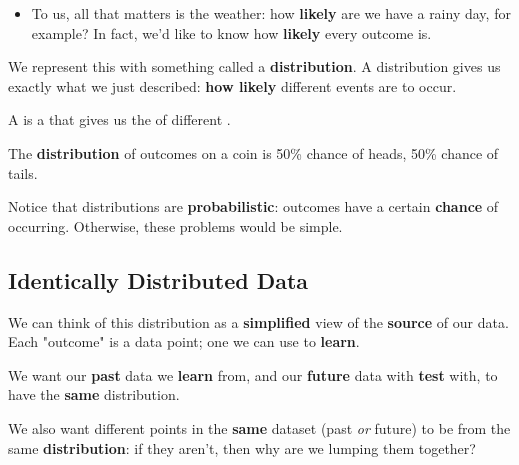         \begin{itemize}
            \item \miniex To us, all that matters is the weather: how \textbf{likely} are we have a rainy day, for example? In fact, we'd like to know how \textbf{likely} every outcome is.
        \end{itemize}
        
        We represent this with something called a \textbf{distribution}. A distribution gives us exactly what we just described: \textbf{how likely} different events are to occur. 
        \\
        
        \begin{definition}
            A  is a  that gives us the  of different .
        \end{definition}
        
        
        \miniex The \textbf{distribution} of outcomes on a coin is 50\% chance of heads, 50\% chance of tails.
        
        Notice that distributions are \textbf{probabilistic}: outcomes have a certain \textbf{chance} of occurring. Otherwise, these problems would be simple.
        
    \subsection{Identically Distributed Data}
        
        We can think of this distribution as a \textbf{simplified} view of the \textbf{source} of our data. Each "outcome" is a data point; one we can use to \textbf{learn}.
        
        We want our \textbf{past} data we \textbf{learn} from, and our \textbf{future} data with \textbf{test} with, to have the \textbf{same} distribution.
        
        We also want different points in the \textbf{same} dataset (past \textit{or} future) to be from the same \textbf{distribution}: if they aren't, then why are we lumping them together? 
        
